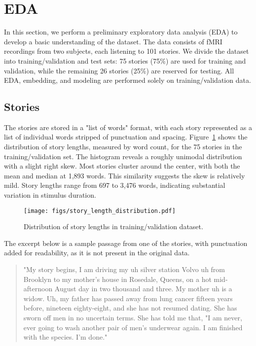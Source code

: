 \documentclass[10pt,letterpaper]{article}
\begin{document}
\section{EDA}

In this section, we perform a preliminary exploratory data analysis (EDA) to develop a basic understanding of the dataset. The data consists of fMRI recordings from two subjects, each listening to 101 stories. We divide the dataset into training/validation and test sets: 75 stories (75\%) are used for training and validation, while the remaining 26 stories (25\%) are reserved for testing. All EDA, embedding, and modeling are performed solely on training/validation data.

\subsection{Stories}

The stories are stored in a "list of words" format, with each story represented as a list of individual words stripped of punctuation and spacing. Figure~\ref{fig:story_length} shows the distribution of story lengths, measured by word count, for the 75 stories in the training/validation set. The histogram reveals a roughly unimodal distribution with a slight right skew. Most stories cluster around the center, with both the mean and median at 1,893 words. This similarity suggests the skew is relatively mild. Story lengths range from 697 to 3,476 words, indicating substantial variation in stimulus duration.

\begin{figure}[ht]
    \centering
    \texttt{[image: figs/story\_length\_distribution.pdf]}
    \caption{Distribution of story lengths in training/validation dataset.}
    \label{fig:story_length}
\end{figure}

The excerpt below is a sample passage from one of the stories, with punctuation added for readability, as it is not present in the original data.

\begin{quotation}
    "My story begins, I am driving my uh silver station Volvo uh from Brooklyn to my mother's house in Rosedale, Queens, on a hot mid-afternoon August day in two thousand and three. My mother uh is a widow. Uh, my father has passed away from lung cancer fifteen years before, nineteen eighty-eight, and she has not resumed dating. She has sworn off men in no uncertain terms. She has told me that, "I am never, ever going to wash another pair of men's underwear again. I am finished with the species. I'm done."
\end{quotation}
\end{document}
